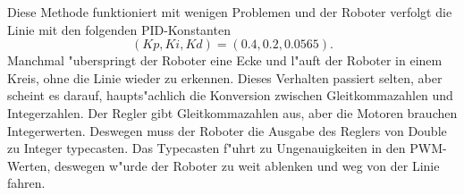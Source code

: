 Diese Methode funktioniert mit wenigen Problemen und der Roboter verfolgt die Linie mit den folgenden PID-Konstanten 
\begin{equation*}
    \left(Kp, Ki, Kd\right) = \left(\num{0.4}, \num{0.2}, \num{0.0565}\right).
\end{equation*}
Manchmal "uberspringt der Roboter eine Ecke und l"auft der Roboter in einem Kreis, ohne die Linie wieder zu erkennen. Dieses Verhalten passiert selten, aber scheint es darauf, haupts"achlich die Konversion zwischen Gleitkommazahlen und Integerzahlen. Der Regler gibt Gleitkommazahlen aus, aber die Motoren brauchen Integerwerten. Deswegen muss der Roboter die Ausgabe des Reglers von Double zu Integer typecasten. Das Typecasten f"uhrt zu Ungenauigkeiten in den PWM-Werten, deswegen w"urde der Roboter zu weit ablenken und weg von der Linie fahren.